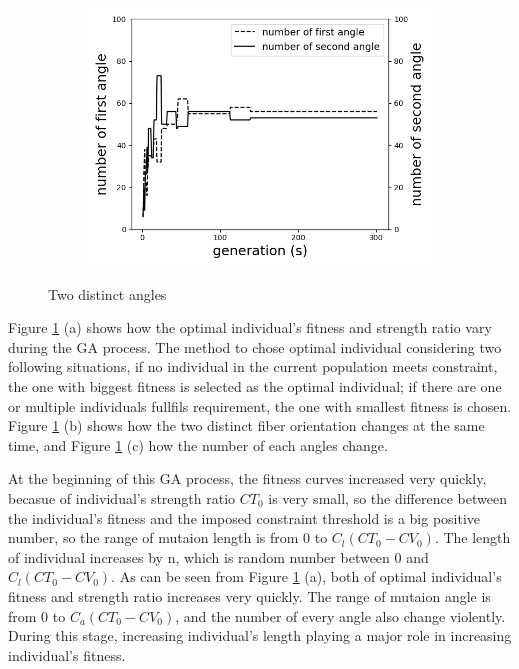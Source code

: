 \documentclass{article}
\begin{document}
\begin{figure}[!t]
		\begin{subfigure}[b]{0.8\linewidth}
			\includegraphics[width=\linewidth]{2020-11-10-pre-image/two_distinct_angler_number_change.png}
		\end{subfigure}
	\caption{Two distinct angles}
	\label{fig:two_angles}
\end{figure}



Figure \ref{fig:two_angles} (a) shows how the optimal individual's fitness and strength
ratio vary during the GA process. The method to chose optimal individual considering two following
situations, if no individual in the current population meets constraint, the one with biggest
fitness is selected as the optimal individual; if there are one or multiple individuals fullfils
requirement, the one with smallest fitness is chosen.  Figure \ref{fig:two_angles} (b) shows how the two distinct fiber
orientation changes at the same time, and Figure  \ref{fig:two_angles} (c) how the number of each angles change.

	At the beginning of this GA process, the fitness curves increased very quickly, becasue of
individual's strength ratio $CT_0$ is very small, so the difference between the individual's fitness and
the imposed constraint threshold is a big positive number, so the range of mutaion length is from 0
to $C_l(CT_0 - CV_0)$. The length of individual increases by n, which is random number between 0 and 
$C_l(CT_0 - CV_0)$. As can be seen from Figure \ref{fig:two_angles} (a), both of optimal
individual's fitness and strength ratio increases very quickly.  The range of mutaion angle is from
0 to $C_a(CT_0 - CV_0)$, and the number of every angle also change violently. During this stage,
increasing individual's length playing a major role in increasing individual's fitness.
\end{document}

